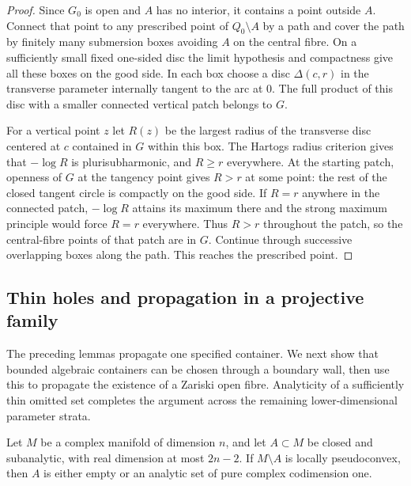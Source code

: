 \begin{proof}
Since $G_0$ is open and $A$ has no interior, it contains a point outside $A$. Connect that point to any prescribed point of $Q_0\setminus A$ by a path and cover the path by finitely many submersion boxes avoiding $A$ on the central fibre. On a sufficiently small fixed one-sided disc the limit hypothesis and compactness give all these boxes on the good side. In each box choose a disc $\Delta(c,r)$ in the transverse parameter internally tangent to the arc at $0$. The full product of this disc with a smaller connected vertical patch belongs to $G$.

For a vertical point $z$ let $R(z)$ be the largest radius of the transverse disc centered at $c$ contained in $G$ within this box. The Hartogs radius criterion gives that $-\log R$ is plurisubharmonic, and $R\geq r$ everywhere. At the starting patch, openness of $G$ at the tangency point gives $R>r$ at some point: the rest of the closed tangent circle is compactly on the good side. If $R=r$ anywhere in the connected patch, $-\log R$ attains its maximum there and the strong maximum principle would force $R=r$ everywhere. Thus $R>r$ throughout the patch, so the central-fibre points of that patch are in $G$. Continue through successive overlapping boxes along the path. This reaches the prescribed point.
\end{proof}

\subsection{Thin holes and propagation in a projective family}

The preceding lemmas propagate one specified container. We next show that bounded algebraic containers can be chosen through a boundary wall, then use this to propagate the existence of a Zariski open fibre. Analyticity of a sufficiently thin omitted set completes the argument across the remaining lower-dimensional parameter strata.

\begin{theorem}
\label{thm:holes-thin-analyticity}
Let $M$ be a complex manifold of dimension $n$, and let $A\subset M$ be closed and subanalytic, with real dimension at most $2n-2$. If $M\setminus A$ is locally pseudoconvex, then $A$ is either empty or an analytic set of pure complex codimension one.
\end{theorem}

